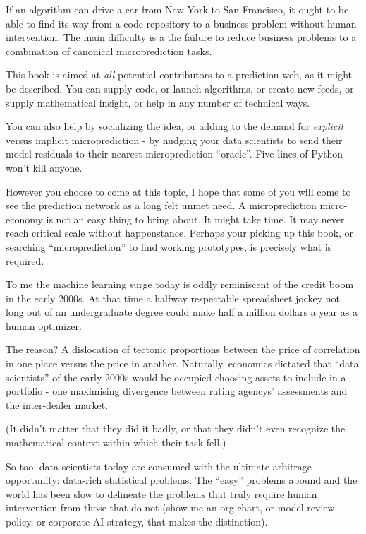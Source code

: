 If an algorithm can drive a car from New York to San Francisco, it ought to be able to find its way from a code repository to a business problem without human intervention. The main difficulty is a the failure to reduce business problems to a combination of canonical microprediction tasks.  

This book is aimed at {\em all} potential contributors to a prediction web, as it might be described. You can supply code, or launch algorithms, or create new feeds, or supply mathematical insight, or help in any number of technical ways. 

You can also help by socializing the idea, or adding to the demand for {\em  explicit} versus implicit microprediction - by nudging your data scientists to send their model residuals to their nearest microprediction ``oracle''. Five lines of Python won't kill anyone.  

However you choose to come at this topic, I hope that some of you will come to see the prediction network as a long felt unmet need. A microprediction micro-economy is not an easy thing to bring about. It might take time. It may never reach critical scale without happenstance. Perhaps your picking up this book, or searching ``microprediction'' to find working prototypes, is precisely what is required.   

\iffalse
To me the machine learning surge today is oddly reminiscent of the credit boom in the early 2000s. At that time a halfway respectable spreadsheet jockey not long out of an undergraduate degree could make half a million dollars a year as a human optimizer. 

The reason? A dislocation of tectonic proportions between the price of correlation in one place versus the price in another. Naturally, economics dictated that ``data scientists'' of the early 2000s would be occupied choosing assets to include in a portfolio - one maximising divergence between rating agencys' assessments and the inter-dealer market. 

(It didn't matter that they did it badly, or that they didn't even recognize the mathematical context within which their task fell.)  

So too, data scientists today are consumed with the ultimate arbitrage opportunity: data-rich statistical problems. The ``easy'' problems abound and the world has been slow to delineate the problems that truly require human intervention from those that do not (show me an org chart, or model review policy, or corporate AI strategy, that makes the distinction). 

